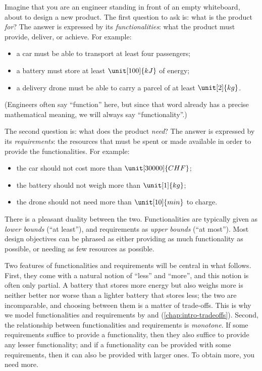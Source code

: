 Imagine that you are an engineer standing in front of an empty whiteboard, about to design a new product.
The first question to ask is: what is the product \emph{for}?
The answer is expressed by its \emph{functionalities}: what the product must provide, deliver, or achieve.
For example:
\begin{itemize}
    \item a car must be able to transport at least four passengers;
    \item a battery must store at least $\unit[100]{kJ}$ of energy;
    \item a delivery drone must be able to carry a parcel of at least $\unit[2]{kg}$.
\end{itemize}
(Engineers often say ``function'' here, but since that word already has a precise mathematical meaning, we will always say ``functionality''.)

The second question is: what does the product \emph{need}?
The answer is expressed by its \emph{requirements}: the resources that must be spent or made available in order to provide the functionalities.
For example:
\begin{itemize}
    \item the car should not cost more than $\unit[30000]{CHF}$;
    \item the battery should not weigh more than $\unit[1]{kg}$;
    \item the drone should not need more than $\unit[10]{min}$ to charge.
\end{itemize}

There is a pleasant duality between the two.
Functionalities are typically given as \emph{lower bounds} (``at least''), and requirements as \emph{upper bounds} (``at most'').
Most design objectives can be phrased as either providing as much functionality as possible, or needing as few resources as possible.

Two features of functionalities and requirements will be central in what follows.
First, they come with a natural notion of ``less'' and ``more'', and this notion is often only partial.
A battery that stores more energy but also weighs more is neither better nor worse than a lighter battery that stores less; the two are incomparable, and choosing between them is a matter of trade-offs.
This is why we model functionalities and requirements by  and  (\cref{chap:intro-tradeoffs}).
Second, the relationship between functionalities and requirements is \emph{monotone}.
If some requirements suffice to provide a functionality, then they also suffice to provide any lesser functionality; and if a functionality can be provided with some requirements, then it can also be provided with larger ones.
To obtain more, you need more.

